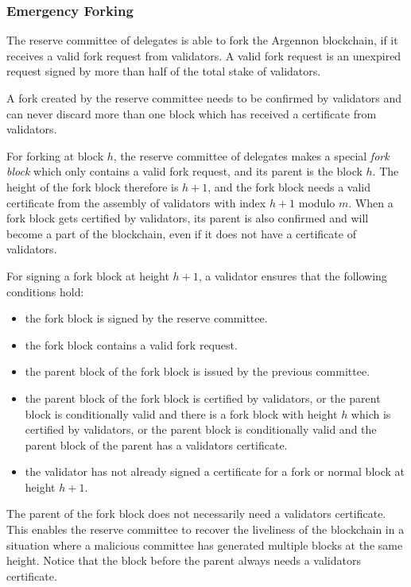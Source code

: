 \subsubsection{Emergency Forking}

The reserve committee of delegates is able to fork the Argennon blockchain, if it receives a valid fork request
from validators.
A valid fork request is an unexpired request signed by more than half of the total stake of validators.

A fork created by the reserve committee needs to be confirmed by validators and can never discard more than one
block which has received a certificate from validators.

For forking at block $h$, the reserve committee of delegates
makes a special \emph{fork block} which only contains a valid fork request, and its parent is the block $h$.
The height of the fork block therefore is $h + 1$, and the fork block needs a valid certificate from the assembly of
validators with index $h+1$ modulo $m$. When a
fork block gets certified by validators, its parent is also confirmed and will become a part of the blockchain, even if
it does not have a certificate of validators.

For signing a fork block at height $h+1$, a validator ensures that the following conditions hold:
\begin{itemize}
    \item the fork block is signed by the reserve committee.
    \item the fork block contains a valid fork request.
    \item the parent block of the fork block is issued by the previous committee.
    \item the parent block of the fork block is certified by validators, or the parent block is conditionally
    valid and there is a fork block with height $h$ which is certified by validators, or the parent block is
    conditionally valid and the parent block of the parent has a validators certificate.
    \item the validator has not already signed a certificate for a fork or normal block at height $h+1$.
\end{itemize}

The parent of the fork block does not necessarily need a validators certificate. This enables the
reserve committee to recover the liveliness of the blockchain in a situation where a malicious committee has
generated multiple blocks at the same height. Notice that the block before the parent always needs a validators
certificate.

